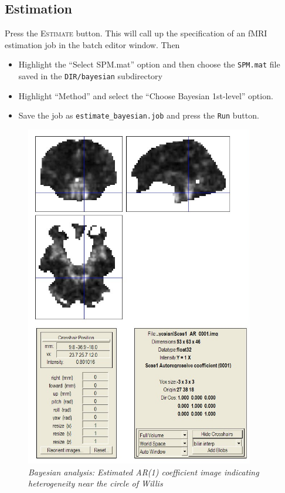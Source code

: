 \subsection{Estimation}

Press the \textsc{Estimate} button. This will call up the specification of an fMRI estimation job in the batch editor window. Then
\begin{itemize}
\item Highlight the ``Select SPM.mat'' option and then choose the \texttt{SPM.mat} file saved in the \texttt{DIR/bayesian} subdirectory
\item Highlight ``Method'' and select the ``Choose Bayesian 1st-level'' option.
\item Save the job as \texttt{estimate\_bayesian.job} and press the \texttt{Run} button.
\end{itemize}

\begin{figure}
\begin{center}
\includegraphics[width=100mm]{faces/face_ar1}
\caption{\em Bayesian analysis: Estimated AR(1) coefficient image indicating heterogeneity near the circle of Willis \label{face_ar1} }
\end{center}
\end{figure}

